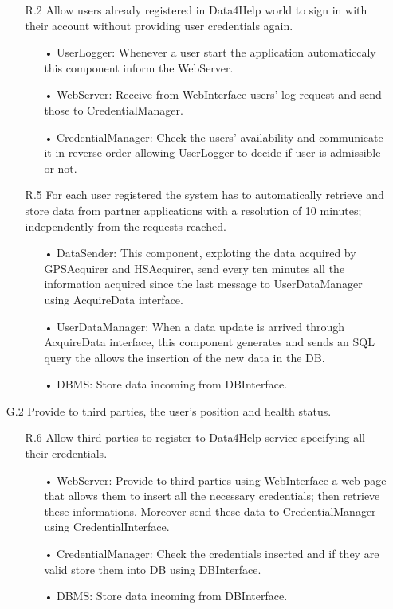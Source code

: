 \begin{enumerate}
\begin{enumerate}
	\item [R.2] Allow users already registered in Data4Help world to sign in with their account without providing user credentials again.
		\begin{enumerate}
		\item[•] UserLogger: Whenever a user start the application automaticcaly this component inform the WebServer.
		\item[•] WebServer: Receive from WebInterface users' log request and send those to CredentialManager.
		\item[•] CredentialManager: Check the users' availability and communicate it in reverse order allowing UserLogger to decide if user is admissible or not.
		\end{enumerate}
	
	\item [R.5] For each user registered the system has to automatically retrieve and store data from partner applications with a resolution of 10 minutes; independently from the requests reached.
		\begin{enumerate}
		\item[•] DataSender: This component, exploting the data acquired by GPSAcquirer and HSAcquirer, send every ten minutes all the information acquired since the last message to UserDataManager using AcquireData interface.
		\item[•] UserDataManager: When a data update is arrived through AcquireData interface, this component generates and sends an SQL query the allows the insertion of the new data in the DB.
		\item[•] DBMS: Store data incoming from DBInterface.
		\end{enumerate}	
	\end{enumerate}

\item [G.2] Provide to third parties, the user’s position and health status.
	\begin{enumerate}
	\item [R.6] Allow third parties to register to Data4Help service specifying all their credentials.
		\begin{enumerate}
		\item[•] WebServer: Provide to third parties using WebInterface a web page that allows them to insert all the necessary credentials; then retrieve these informations. Moreover send these data to CredentialManager using CredentialInterface.
		\item[•] CredentialManager: Check the credentials inserted and if they are valid store them into DB using DBInterface.
		\item[•] DBMS: Store data incoming from DBInterface.
		\end{enumerate}
		

\end{enumerate}
\end{enumerate}
